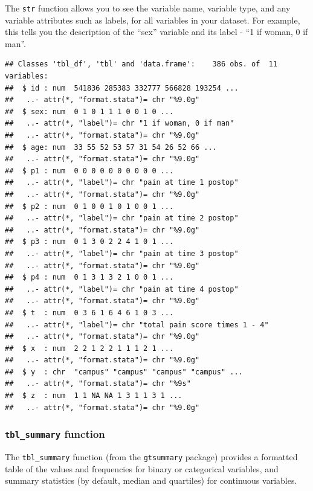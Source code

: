 \documentclass[]{book}
\newenvironment{Shaded}{\begin{snugshade}}{\end{snugshade}}
\newcommand{\KeywordTok}[1]{\textcolor[rgb]{0.13,0.29,0.53}{\textbf{#1}}}
\newcommand{\NormalTok}[1]{#1}
\newcommand{\OperatorTok}[1]{\textcolor[rgb]{0.81,0.36,0.00}{\textbf{#1}}}
\newcommand{\StringTok}[1]{\textcolor[rgb]{0.31,0.60,0.02}{#1}}
\begin{document}
The \texttt{str} function allows you to see the variable name, variable
type, and any variable attributes such as labels, for all variables in
your dataset. For example, this tells you the description of the ``sex''
variable and its label - ``1 if woman, 0 if man''.

\begin{Shaded}
\end{Shaded}

\begin{verbatim}
## Classes 'tbl_df', 'tbl' and 'data.frame':    386 obs. of  11 variables:
##  $ id : num  541836 285383 332777 566828 193254 ...
##   ..- attr(*, "format.stata")= chr "%9.0g"
##  $ sex: num  0 1 0 1 1 1 0 0 1 0 ...
##   ..- attr(*, "label")= chr "1 if woman, 0 if man"
##   ..- attr(*, "format.stata")= chr "%9.0g"
##  $ age: num  33 55 52 53 57 31 54 26 52 66 ...
##   ..- attr(*, "format.stata")= chr "%9.0g"
##  $ p1 : num  0 0 0 0 0 0 0 0 0 0 ...
##   ..- attr(*, "label")= chr "pain at time 1 postop"
##   ..- attr(*, "format.stata")= chr "%9.0g"
##  $ p2 : num  0 1 0 0 1 0 1 0 0 1 ...
##   ..- attr(*, "label")= chr "pain at time 2 postop"
##   ..- attr(*, "format.stata")= chr "%9.0g"
##  $ p3 : num  0 1 3 0 2 2 4 1 0 1 ...
##   ..- attr(*, "label")= chr "pain at time 3 postop"
##   ..- attr(*, "format.stata")= chr "%9.0g"
##  $ p4 : num  0 1 3 1 3 2 1 0 0 1 ...
##   ..- attr(*, "label")= chr "pain at time 4 postop"
##   ..- attr(*, "format.stata")= chr "%9.0g"
##  $ t  : num  0 3 6 1 6 4 6 1 0 3 ...
##   ..- attr(*, "label")= chr "total pain score times 1 - 4"
##   ..- attr(*, "format.stata")= chr "%9.0g"
##  $ x  : num  2 2 1 2 2 1 1 1 2 1 ...
##   ..- attr(*, "format.stata")= chr "%9.0g"
##  $ y  : chr  "campus" "campus" "campus" "campus" ...
##   ..- attr(*, "format.stata")= chr "%9s"
##  $ z  : num  1 1 NA NA 1 3 1 1 3 1 ...
##   ..- attr(*, "format.stata")= chr "%9.0g"
\end{verbatim}

\hypertarget{tbl_summary-function-1}{%
\subsubsection{\texorpdfstring{\texttt{tbl\_summary}
function}{tbl\_summary function}}\label{tbl_summary-function-1}}

The \texttt{tbl\_summary} function (from the \texttt{gtsummary} package)
provides a formatted table of the values and frequencies for binary or
categorical variables, and summary statistics (by default, median and
quartiles) for continuous variables.
\end{document}
